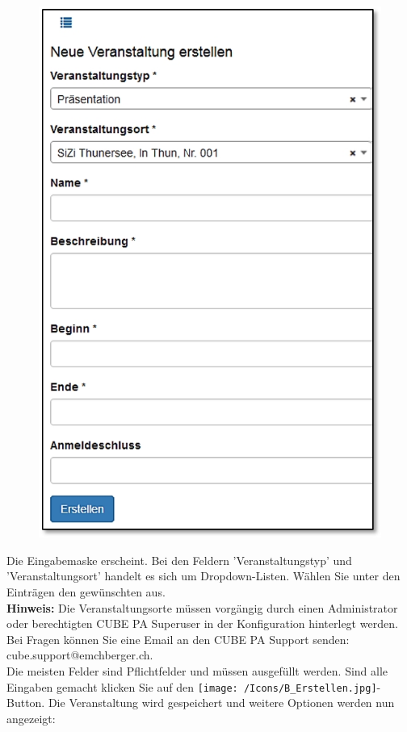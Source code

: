 \begin{figure}   %
  \vspace{-25pt}      %
  \begin{center}
    \includegraphics[width=1\linewidth]{../chapters/10_CRM/pictures/10-2-1_NeueVeranstaltung.jpg}
  \end{center}
  \vspace{-20pt}
  \vspace{-10pt}
\end{figure}

Die Eingabemaske erscheint. Bei den Feldern 'Veranstaltungstyp' und 'Veranstaltungsort' handelt es sich um Dropdown-Listen. Wählen Sie unter den Einträgen den gewünschten aus.\\
\textbf{Hinweis:} Die Veranstaltungsorte müssen vorgängig durch einen Administrator oder berechtigten CUBE PA Superuser in der Konfiguration hinterlegt werden. Bei Fragen können Sie eine Email an den CUBE PA Support senden: {\color{red} cube.support@emchberger.ch}.\\
Die meisten Felder sind Pflichtfelder und müssen ausgefüllt werden. Sind alle Eingaben gemacht klicken Sie auf den \texttt{[image: /Icons/B\_Erstellen.jpg]}-Button. Die Veranstaltung wird gespeichert und weitere Optionen werden nun angezeigt:

